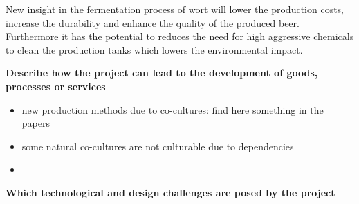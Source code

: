 
New insight in the fermentation process of wort will lower the production costs, increase the durability and enhance the quality of the
produced beer. Furthermore it has the potential to reduces the need for high aggressive chemicals to clean the production tanks which
lowers the environmental impact.


\noindent
\textbf{Describe how the project can lead to the development of goods, processes or services}
\begin{itemize}
 \item new production methods due to co-cultures: find here something in the papers
 \item some natural co-cultures are not culturable due to dependencies \cite{d2010siderophores}
 \item 
\end{itemize}


\noindent
\textbf{Which technological and design challenges are posed by the project}

